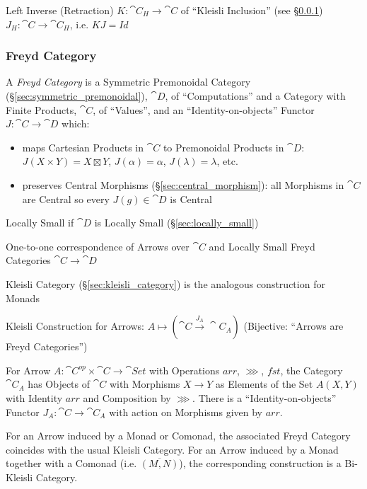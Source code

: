 Left Inverse (Retraction) $K : \cat{C}_H \rightarrow \cat{C}$ of
``Kleisli Inclusion'' (see \S\ref{sec:freyd_category}) $J_H : \cat{C}
\rightarrow \cat{C}_H$, i.e. $K J = Id$



\subsubsection{Freyd Category}\label{sec:freyd_category}

A \emph{Freyd Category} is a Symmetric Premonoidal Category
(\S\ref{sec:symmetric_premonoidal}), $\cat{D}$, of
``Computations'' and a Category with Finite Products, $\cat{C}$, of
``Values'', and an ``Identity-on-objects'' Functor $J : \cat{C}
\rightarrow \cat{D}$ which:
\begin{itemize}
\item maps Cartesian Products in $\cat{C}$ to Premonoidal Products in
  $\cat{D}$: $J(X \times Y) = X \boxtimes Y$, $J(\alpha) = \alpha$,
  $J(\lambda) = \lambda$, etc.
\item preserves Central Morphisms (\S\ref{sec:central_morphism}): all
  Morphisms in $\cat{C}$ are Central so every $J(g) \in \cat{D}$ is
  Central
\end{itemize}
\cite{jacobs-heunen-hasuo09}

Locally Small if $\cat{D}$ is Locally Small
(\S\ref{sec:locally_small})

One-to-one correspondence of Arrows over $\cat{C}$ and Locally Small
Freyd Categories $\cat{C} \rightarrow \cat{D}$

Kleisli Category (\S\ref{sec:kleisli_category}) is the analogous
construction for Monads

Kleisli Construction for Arrows: $A \mapsto (\cat{C} \xrightarrow{J_A}
\cat{C}_A)$ (Bijective: ``Arrows are Freyd Categories'')

For Arrow $A : \cat{C}^{op} \times \cat{C} \rightarrow \cat{Set}$ with
Operations $arr$, $\ggg$, $fst$, the Category $\cat{C}_A$ has Objects
of $\cat{C}$ with Morphisms $X \rightarrow Y$ as Elements of the Set
$A(X,Y)$ with Identity $arr$ and Composition by $\ggg$. There is a
``Identity-on-objects'' Functor $J_A : \cat{C} \rightarrow \cat{C}_A$
with action on Morphisms given by $arr$.

For an Arrow induced by a Monad or Comonad, the associated Freyd
Category coincides with the usual Kleisli Category. For an Arrow
induced by a Monad together with a Comonad (i.e. $\overline{(M,N)}$),
the corresponding construction is a Bi-Kleisli Category.
\cite{jacobs-heunen-hasuo09}

